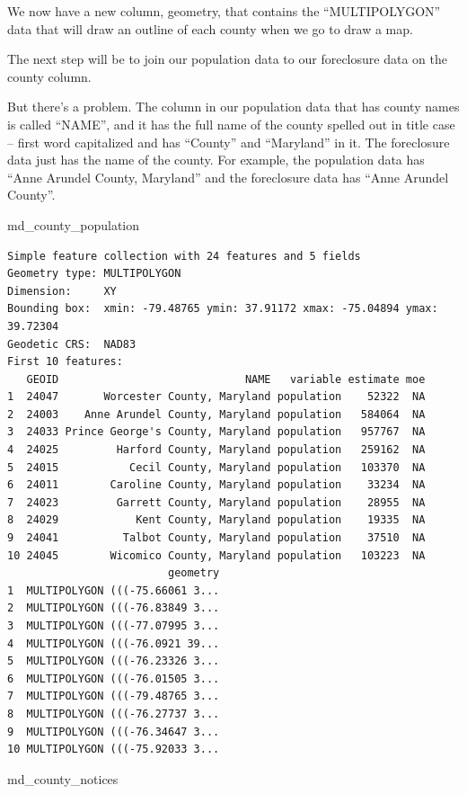\documentclass[
  letterpaper,
  DIV=11,
  numbers=noendperiod]{scrreprt}
\newenvironment{Shaded}{\begin{snugshade}}{\end{snugshade}}
\newcommand{\NormalTok}[1]{\textcolor[rgb]{0.00,0.23,0.31}{#1}}
\begin{document}
We now have a new column, geometry, that contains the ``MULTIPOLYGON''
data that will draw an outline of each county when we go to draw a map.

The next step will be to join our population data to our foreclosure
data on the county column.

But there's a problem. The column in our population data that has county
names is called ``NAME'', and it has the full name of the county spelled
out in title case -- first word capitalized and has ``County'' and
``Maryland'' in it. The foreclosure data just has the name of the
county. For example, the population data has ``Anne Arundel County,
Maryland'' and the foreclosure data has ``Anne Arundel County''.

\begin{Shaded}
\begin{Highlighting}[]
\NormalTok{md\_county\_population}
\end{Highlighting}
\end{Shaded}

\begin{verbatim}
Simple feature collection with 24 features and 5 fields
Geometry type: MULTIPOLYGON
Dimension:     XY
Bounding box:  xmin: -79.48765 ymin: 37.91172 xmax: -75.04894 ymax: 39.72304
Geodetic CRS:  NAD83
First 10 features:
   GEOID                             NAME   variable estimate moe
1  24047       Worcester County, Maryland population    52322  NA
2  24003    Anne Arundel County, Maryland population   584064  NA
3  24033 Prince George's County, Maryland population   957767  NA
4  24025         Harford County, Maryland population   259162  NA
5  24015           Cecil County, Maryland population   103370  NA
6  24011        Caroline County, Maryland population    33234  NA
7  24023         Garrett County, Maryland population    28955  NA
8  24029            Kent County, Maryland population    19335  NA
9  24041          Talbot County, Maryland population    37510  NA
10 24045        Wicomico County, Maryland population   103223  NA
                         geometry
1  MULTIPOLYGON (((-75.66061 3...
2  MULTIPOLYGON (((-76.83849 3...
3  MULTIPOLYGON (((-77.07995 3...
4  MULTIPOLYGON (((-76.0921 39...
5  MULTIPOLYGON (((-76.23326 3...
6  MULTIPOLYGON (((-76.01505 3...
7  MULTIPOLYGON (((-79.48765 3...
8  MULTIPOLYGON (((-76.27737 3...
9  MULTIPOLYGON (((-76.34647 3...
10 MULTIPOLYGON (((-75.92033 3...
\end{verbatim}

\begin{Shaded}
\begin{Highlighting}[]
\NormalTok{md\_county\_notices}
\end{Highlighting}
\end{Shaded}
\end{document}
